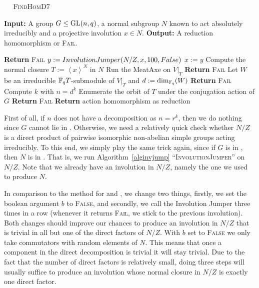 \begin{algorithm}
\caption{$\quad$ \textsc{FindHomD7}}
%
\label{algreductionD7}
\begin{algorithmic}
\STATE \textbf{Input:} A group $G \le \GL(n,q)$, a normal subgroup $N$ known 
to act absolutely irreducibly 
\STATE \mbox{} and a projective involution $x \in N$.
\STATE \textbf{Output:} A reduction homomorphism or \textsc{Fail}.

\smallskip
{}
    \STATE \textbf{Return} \textsc{Fail}
\ENDIF
{}
    \STATE $y := \textsc{InvolutionJumper}(N/Z,x,100,\textsc{False})$
        \STATE $x := y$
    \ENDIF
\ENDFOR
\STATE Compute the normal closure $T := \left< x \right>^N$ in $N$
\STATE Run the MeatAxe on $V|_T$
    \STATE \textbf{Return} \textsc{Fail}
\ENDIF
\STATE Let $W$ be an irreducible $\mathbb{F}_q T$-submodule of $V|_T$ and $d :=
\dim_{\mathbb{F}_q}(W)$
    \STATE \textbf{Return} \textsc{Fail}
\ENDIF
\STATE Compute $k$ with $n=d^k$
\STATE Enumerate the orbit of $T$ under the conjugation action of $G$
    \STATE \textbf{Return} \textsc{Fail}
\ENDIF
\STATE \textbf{Return} action homomorphism as reduction
\end{algorithmic}
\end{algorithm}

First of all, if $n$ does not have a decomposition as
$n=r^k$, then we do nothing since $G$ cannot lie in . Otherwise,
we need a relatively quick check whether $N/Z$ is a direct product of
pairwise isomorphic non-abelian simple groups acting irreducibly. To
this end, we simply play the same trick again, since if $G$ is in ,
then $N$ is in . That is, we run Algorithm~\ref{alginvjump}
``\textsc{InvolutionJumper}'' on $N/Z$. Note that we already have an
involution in $N/Z$, namely the one we used to produce $N$.

In comparison to the method for  and , we change two things,
firstly, we set the boolean argument $b$ to \textsc{False}, and
secondly, we call the Involution Jumper three times in a row (whenever
it returns \textsc{Fail}, we stick to the previous involution).
Both changes should improve our chances to produce an involution in $N/Z$
that is trivial in all but one of the direct factors of $N/Z$. With $b$ set
to \textsc{False} we only take commutators with random elements of $N$.
This means that once a component in the direct decomposition is trivial it
will stay trivial. Due to the fact that the number of direct factors is
relatively small, doing three steps will usually suffice to produce an
involution whose normal closure in $N/Z$ is exactly one direct factor.

